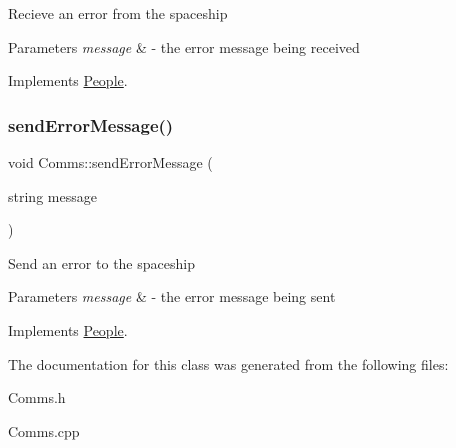 Recieve an error from the spaceship 
\begin{DoxyParams}{Parameters}
{\em message} & -\/ the error message being received \\
\hline
\end{DoxyParams}


Implements \hyperlink{classPeople_a0685df78be631783138865e03cc7c85d}{People}.

\mbox{\label{classComms_a23c37f6d10f06c7cfe25c4dc7d62fa12}} 
\subsubsection{\texorpdfstring{send\+Error\+Message()}{sendErrorMessage()}}
{\footnotesize\ttfamily void Comms\+::send\+Error\+Message (\begin{DoxyParamCaption}\item[{string}]{message }\end{DoxyParamCaption})\hspace{0.3cm}{\ttfamily [virtual]}}

Send an error to the spaceship 
\begin{DoxyParams}{Parameters}
{\em message} & -\/ the error message being sent \\
\hline
\end{DoxyParams}


Implements \hyperlink{classPeople_a572a35170f61d1848eb04b65baafb057}{People}.



The documentation for this class was generated from the following files\+:\begin{DoxyCompactItemize}
\item 
Comms.\+h\item 
Comms.\+cpp\end{DoxyCompactItemize}

